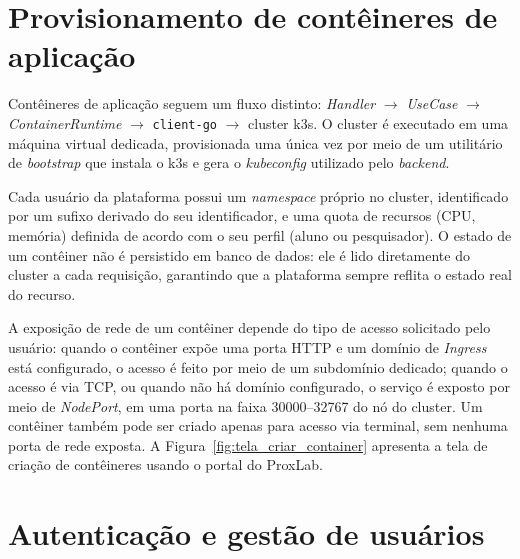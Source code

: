 
\section{Provisionamento de contêineres de aplicação}

Contêineres de aplicação seguem um fluxo distinto: \textit{Handler} \(\rightarrow\) \textit{UseCase} \(\rightarrow\) \textit{ContainerRuntime} \(\rightarrow\) \texttt{client-go} \(\rightarrow\) cluster k3s. O cluster é executado em uma máquina virtual dedicada, provisionada uma única vez por meio de um utilitário de \textit{bootstrap} que instala o k3s e gera o \textit{kubeconfig} utilizado pelo \textit{backend}.\\

\par Cada usuário da plataforma possui um \textit{namespace} próprio no cluster, identificado por um sufixo derivado do seu identificador, e uma quota de recursos (CPU, memória) definida de acordo com o seu perfil (aluno ou pesquisador). O estado de um contêiner não é persistido em banco de dados: ele é lido diretamente do cluster a cada requisição, garantindo que a plataforma sempre reflita o estado real do recurso.\\

\par A exposição de rede de um contêiner depende do tipo de acesso solicitado pelo usuário: quando o contêiner expõe uma porta HTTP e um domínio de \textit{Ingress} está configurado, o acesso é feito por meio de um subdomínio dedicado; quando o acesso é via TCP, ou quando não há domínio configurado, o serviço é exposto por meio de \textit{NodePort}, em uma porta na faixa 30000–32767 do nó do cluster. Um contêiner também pode ser criado apenas para acesso via terminal, sem nenhuma porta de rede exposta. A Figura~\ref{fig:tela_criar_container} apresenta a tela de criação de contêineres usando o portal do ProxLab.


\section{Autenticação e gestão de usuários}

